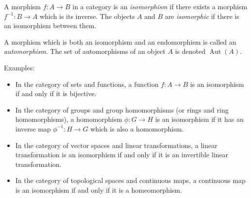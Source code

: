 \documentclass{article}
\begin{document}
A morphism $f: A \longrightarrow B$ in a category is an \emph{isomorphism} if there exists a morphism $f^{-1}: B \longrightarrow A$ which is its inverse. The objects $A$ and $B$ are \emph{isomorphic} if there is an isomorphism between them.

A morphism which is both an isomorphism and an endomorphism is called an \emph{automorphism}. The set of automorphisms of an object $A$ is denoted $\operatorname{Aut}(A)$.

Examples:
\begin{itemize}
\item In the category of sets and functions, a function $f: A \longrightarrow B$ is an isomorphism if and only if it is bijective.
\item In the category of groups and group homomorphisms (or rings and ring homomorphisms), a homomorphism $\phi: G \longrightarrow H$ is an isomorphism if it has an inverse map $\phi^{-1}: H \longrightarrow G$ which is also a homomorphism.
\item In the category of vector spaces and linear transformations, a linear transformation is an isomorphism if and only if it is an invertible linear transformation.
\item In the category of topological spaces and continuous maps, a continuous map is an isomorphism if and only if it is a homeomorphism.
\end{itemize}
\end{document}
